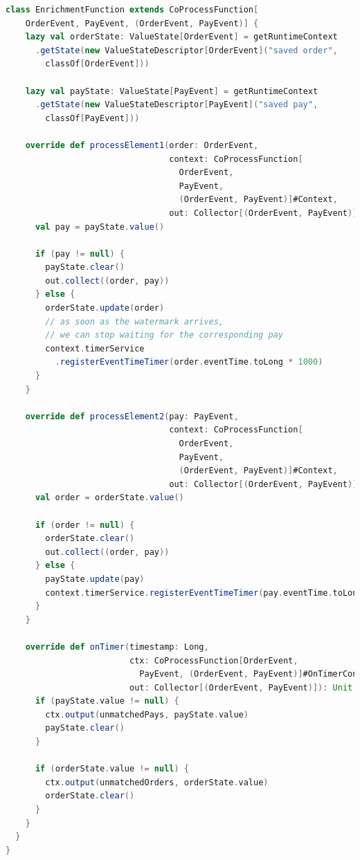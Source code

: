 \documentclass[oneside]{ctexbook}
\begin{document}
\begin{lstlisting}[language=scala]
  class EnrichmentFunction extends CoProcessFunction[
    OrderEvent, PayEvent, (OrderEvent, PayEvent)] {
    lazy val orderState: ValueState[OrderEvent] = getRuntimeContext
      .getState(new ValueStateDescriptor[OrderEvent]("saved order",
        classOf[OrderEvent]))

    lazy val payState: ValueState[PayEvent] = getRuntimeContext
      .getState(new ValueStateDescriptor[PayEvent]("saved pay",
        classOf[PayEvent]))

    override def processElement1(order: OrderEvent,
                                 context: CoProcessFunction[
                                   OrderEvent,
                                   PayEvent,
                                   (OrderEvent, PayEvent)]#Context,
                                 out: Collector[(OrderEvent, PayEvent)]): Unit = {
      val pay = payState.value()

      if (pay != null) {
        payState.clear()
        out.collect((order, pay))
      } else {
        orderState.update(order)
        // as soon as the watermark arrives,
        // we can stop waiting for the corresponding pay
        context.timerService
          .registerEventTimeTimer(order.eventTime.toLong * 1000)
      }
    }

    override def processElement2(pay: PayEvent,
                                 context: CoProcessFunction[
                                   OrderEvent,
                                   PayEvent,
                                   (OrderEvent, PayEvent)]#Context,
                                 out: Collector[(OrderEvent, PayEvent)]): Unit = {
      val order = orderState.value()

      if (order != null) {
        orderState.clear()
        out.collect((order, pay))
      } else {
        payState.update(pay)
        context.timerService.registerEventTimeTimer(pay.eventTime.toLong * 1000)
      }
    }

    override def onTimer(timestamp: Long,
                         ctx: CoProcessFunction[OrderEvent,
                           PayEvent, (OrderEvent, PayEvent)]#OnTimerContext,
                         out: Collector[(OrderEvent, PayEvent)]): Unit = {
      if (payState.value != null) {
        ctx.output(unmatchedPays, payState.value)
        payState.clear()
      }

      if (orderState.value != null) {
        ctx.output(unmatchedOrders, orderState.value)
        orderState.clear()
      }
    }
  }
}
\end{lstlisting}
\end{document}
